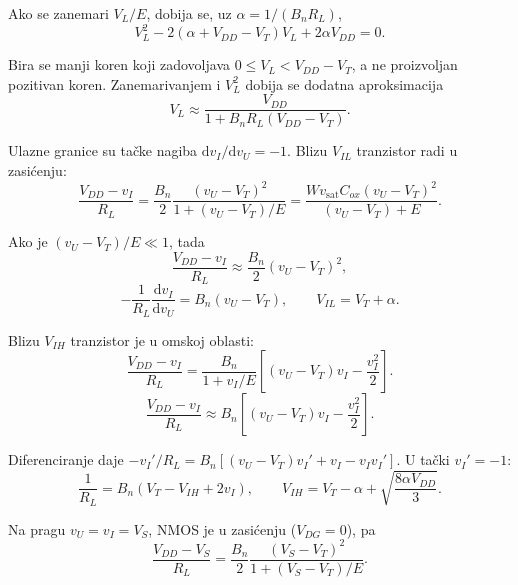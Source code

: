 \documentclass[a4paper,11pt]{article}
\numberwithin{equation}{section}
\begin{document}
Ako se zanemari $V_L/E$, dobija se, uz $\alpha=1/(B_nR_L)$,
\begin{equation}\label{eq:1.9}
V_L^2-2(\alpha+V_{DD}-V_T)V_L+2\alpha V_{DD}=0.
\end{equation}

Bira se manji koren koji zadovoljava $0\le V_L<V_{DD}-V_T$, a ne proizvoljan pozitivan koren. Zanemarivanjem i $V_L^2$ dobija se dodatna aproksimacija
\begin{equation}\label{eq:1.10}
V_L\approx\frac{V_{DD}}{1+B_nR_L(V_{DD}-V_T)}.
\end{equation}

Ulazne granice su tačke nagiba $\mathrm d v_I/\mathrm d v_U=-1$. Blizu $V_{IL}$ tranzistor radi u zasićenju:
\begin{equation}\label{eq:1.2}
\frac{V_{DD}-v_I}{R_L}=\frac{B_n}{2}\frac{(v_U-V_T)^2}{1+(v_U-V_T)/E}=\frac{Wv_{\mathrm{sat}}C_{ox}(v_U-V_T)^2}{(v_U-V_T)+E}.
\end{equation}

Ako je $(v_U-V_T)/E\ll1$, tada
\begin{equation}\label{eq:1.3}
\frac{V_{DD}-v_I}{R_L}\approx\frac{B_n}{2}(v_U-V_T)^2,
\end{equation}
\begin{equation}\label{eq:1.4}
-\frac1{R_L}\frac{\mathrm d v_I}{\mathrm d v_U}=B_n(v_U-V_T),\qquad V_{IL}=V_T+\alpha.
\end{equation}

Blizu $V_{IH}$ tranzistor je u omskoj oblasti:
\begin{equation}\label{eq:1.5}
\frac{V_{DD}-v_I}{R_L}=\frac{B_n}{1+v_I/E}\left[(v_U-V_T)v_I-\frac{v_I^2}{2}\right].
\end{equation}
\begin{equation}\label{eq:1.6}
\frac{V_{DD}-v_I}{R_L}\approx B_n\left[(v_U-V_T)v_I-\frac{v_I^2}{2}\right].
\end{equation}

Diferenciranje daje $-v_I'/R_L=B_n[(v_U-V_T)v_I'+v_I-v_Iv_I']$. U tački $v_I'=-1$:
\begin{equation}\label{eq:1.7}
\frac1{R_L}=B_n(V_T-V_{IH}+2v_I),\qquad V_{IH}=V_T-\alpha+\sqrt{\frac{8\alpha V_{DD}}3}.
\end{equation}

Na pragu $v_U=v_I=V_S$, NMOS je u zasićenju ($V_{DG}=0$), pa
\begin{equation}\label{eq:1.8}
\frac{V_{DD}-V_S}{R_L}=\frac{B_n}{2}\frac{(V_S-V_T)^2}{1+(V_S-V_T)/E}.
\end{equation}
\end{document}

